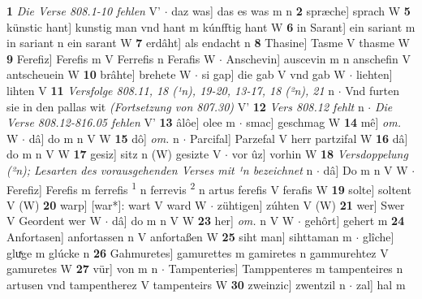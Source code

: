 \documentclass[8pt,a4paper,notitlepage]{article}
\begin{document}
\begin{table}[ht]
\begin{minipage}[t]{0.5\linewidth}
\textbf{1} \textit{Die Verse 808.1-10 fehlen} V'   $\cdot$ daz was] das es was m n \textbf{2} spræche] sprach W \textbf{5} künstic hant] kunstig man vnd hant m kúnfftig hant W \textbf{6} in Sarant] ein sariant m in sariant n ein sarant W \textbf{7} erdâht] als endacht n \textbf{8} Thasine] Tasme V thasme W \textbf{9} Ferefiz] Ferefis m V Ferrefis n Ferafis W  $\cdot$ Anschevin] auscevin m n anschefin V antscheuein W \textbf{10} brâhte] brehete W  $\cdot$ si gap] die gab V vnd gab W  $\cdot$ liehten] lihten V \textbf{11} \textit{Versfolge 808.11, 18 (¹n), 19-20, 13-17, 18 (²n), 21} n   $\cdot$ Vnd furten sie in den pallas wit \textit{(Fortsetzung von 807.30)} V' \textbf{12} \textit{Vers 808.12 fehlt} n   $\cdot$ \textit{Die Verse 808.12-816.05 fehlen} V'  \textbf{13} âlôe] olee m  $\cdot$ smac] geschmag W \textbf{14} mê] \textit{om.} W  $\cdot$ dâ] do m n V W \textbf{15} dô] \textit{om.} n  $\cdot$ Parcifal] Parzefal V herr partzifal W \textbf{16} dâ] do m n V W \textbf{17} gesiz] sitz n (W) gesizte V  $\cdot$ vor ûz] vorhin W \textbf{18} \textit{Versdoppelung (²n); Lesarten des vorausgehenden Verses mit ¹n bezeichnet} n   $\cdot$ dâ] Do m n V W  $\cdot$ Ferefiz] Ferefis m ferrefis \textsuperscript{1}\hspace{-1.3mm} n ferrevis \textsuperscript{2}\hspace{-1.3mm} n artus ferefis V ferafis W \textbf{19} solte] soltent V (W) \textbf{20} warp] [war*]: wart V ward W  $\cdot$ zühtigen] zúhten V (W) \textbf{21} wer] Swer V Geordent wer W  $\cdot$ dâ] do m n V W \textbf{23} her] \textit{om.} n V W  $\cdot$ gehôrt] gehert m \textbf{24} Anfortasen] anfortassen n V anfortaßen W \textbf{25} siht man] sihttaman m  $\cdot$ glîche] gluͯge m glúcke n \textbf{26} Gahmuretes] gamurettes m gamiretes n gammurehtez V gamuretes W \textbf{27} vür] von m n  $\cdot$ Tampenteries] Tamppenteres m tampenteires n artusen vnd tampentherez V tampenteirs W \textbf{30} zweinzic] zwentzil n  $\cdot$ zal] hal m \newline
\end{minipage}
\end{table}
\newpage
\end{document}
